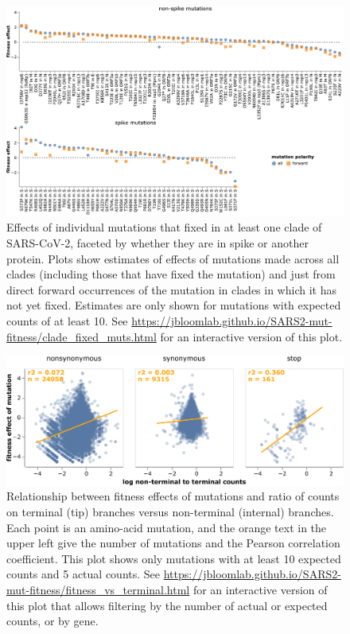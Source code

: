 \documentclass[9pt,twocolumn,twoside]{gsajnl_modified}
\begin{document}
\begin{figure}[b]
\includegraphics[width=\linewidth]{figs/fixed.pdf}
\caption{
Effects of individual mutations that fixed in at least one clade of SARS-CoV-2, faceted by whether they are in spike or another protein.
Plots show estimates of effects of mutations made across all clades (including those that have fixed the mutation) and just from direct forward occurrences of the mutation in clades in which it has not yet fixed.
Estimates are only shown for mutations with expected counts of at least 10.
See \url{https://jbloomlab.github.io/SARS2-mut-fitness/clade_fixed_muts.html} for an interactive version of this plot.
\label{fig:fixed}
}
\end{figure}


\begin{figure}
\centering
\includegraphics[width=0.75\linewidth]{figs/terminal.png}
\caption{
Relationship between fitness effects of mutations and ratio of counts on terminal (tip) branches versus non-terminal (internal) branches.
Each point is an amino-acid mutation, and the orange text in the upper left give the number of mutations and the Pearson correlation coefficient.
This plot shows only mutations with at least 10 expected counts and 5 actual counts.
See \url{https://jbloomlab.github.io/SARS2-mut-fitness/fitness_vs_terminal.html} for an interactive version of this plot that allows filtering by the number of actual or expected counts, or by gene.
\label{fig:terminal}
}
\end{figure}
\end{document}
